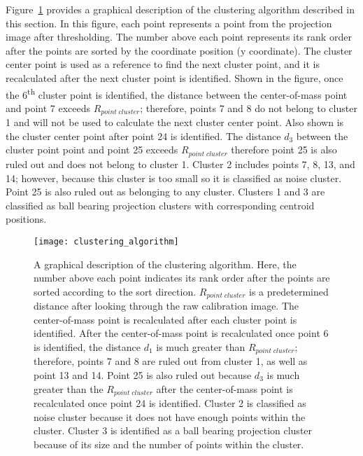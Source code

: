 Figure~\ref{fig:clustering_algorithm} provides a graphical description of the clustering algorithm described in this section.  In this figure, each point represents a point from the projection image after thresholding.  The number above each point represents its rank order after the points are sorted by the coordinate position (y coordinate).  The cluster center point is used as a reference to find the next cluster point, and it is recalculated after the next cluster point is identified.  Shown in the figure, once the 6\textsuperscript{th} cluster point is identified, the distance between the center-of-mass point and point 7 exceeds $R_{point \; cluster}$; therefore, points 7 and 8 do not belong to cluster 1 and will not be used to calculate the next cluster center point.  Also shown is the cluster center point after point 24 is identified. The distance $d_3$ between the cluster point point and point 25 exceeds $R_{point \; cluster}$ therefore point 25 is also ruled out and does not belong to cluster 1.  Cluster 2 includes points 7, 8, 13, and 14; however, because this cluster is too small so it is classified as noise cluster.  Point 25 is also ruled out as belonging to any cluster.  Clusters 1 and 3 are classified as ball bearing projection clusters with corresponding centroid positions.
%
\begin{figure}[ht]
\centering
\texttt{[image: clustering\_algorithm]}
\caption{A graphical description of the clustering algorithm.  Here, the number above each point indicates its rank order after the points are sorted according to the sort direction.  $R_{point \; cluster}$ is a predetermined distance after looking through the raw calibration image.  The center-of-mass point is recalculated after each cluster point is identified.  After the center-of-mass point is recalculated once point 6 is identified, the distance $d_1$ is much greater than $R_{point \; cluster}$; therefore, points 7 and 8 are ruled out from cluster 1, as well as point 13 and 14.  Point 25 is also ruled out because $d_3$ is much greater than the $R_{point \; cluster}$ after the center-of-mass point is recalculated once point 24 is identified.  Cluster 2 is classified as noise cluster because it does not have enough points within the cluster.  Cluster 3 is identified as a ball bearing projection cluster because of its size and the number of points within the cluster.}
\label{fig:clustering_algorithm}
\end{figure}


